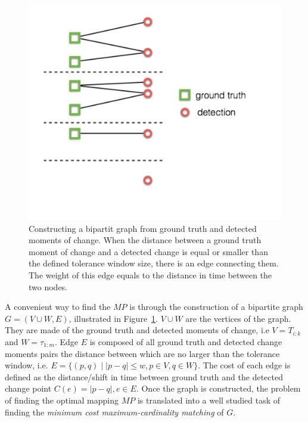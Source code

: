 \begin{figure}[!htb]
\centering
\includegraphics[width=.95\textwidth]{gfx/chap4/bipartit_graph_cons.pdf}
\caption{Constructing a bipartit graph from ground truth and detected moments of change. When the distance between a ground truth moment of change and a detected change is equal or smaller than the defined tolerance window size, there is an edge connecting them. The weight of this edge equals to the distance in time between the two nodes.}
\label{fig:bipartit_graph_cons}
\end{figure}

A convenient way to find the $MP$ is through the construction of a bipartite graph$G = (V \cup W, E)$, illustrated in Figure~\ref{fig:bipartit_graph_cons}.
$V \cup W$ are the vertices of the graph.
They are made of the ground truth and detected moments of change, i.e $V = T_{i:k}$ and $W = \tau_{1:m}$.
Edge $E$ is composed of all ground truth and detected change moments pairs the distance between which are no larger than the tolerance window, i.e. $E = \{(p, q) \mid |p - q| \leq w, p \in V, q \in W \}$.
The cost of each edge is defined as the distance/shift in time between ground truth and the detected change point $C(e) = |p-q|, e \in E$.
Once the graph is constructed, the problem of finding the optimal mapping $MP$ is translated into a well studied task of finding the \textit{minimum cost maximum-cardinality matching} of $G$.

